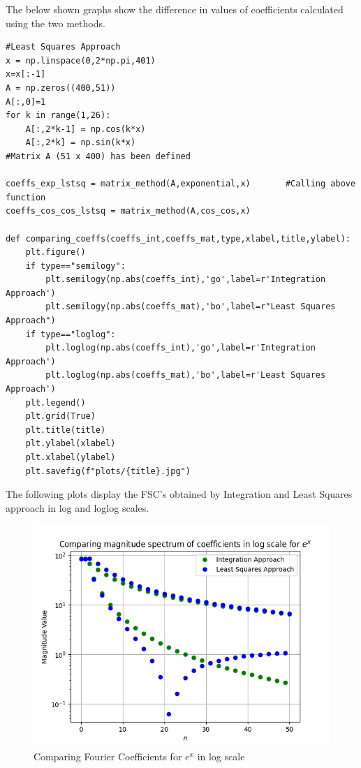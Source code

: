 \documentclass{article}
\begin{document}
\par The below shown graphs show the difference in values of coefficients calculated using the two methods.


\begin{lstlisting}
#Least Squares Approach
x = np.linspace(0,2*np.pi,401)
x=x[:-1]  
A = np.zeros((400,51)) 
A[:,0]=1 
for k in range(1,26):
    A[:,2*k-1] = np.cos(k*x) 
    A[:,2*k] = np.sin(k*x) 
#Matrix A (51 x 400) has been defined 

coeffs_exp_lstsq = matrix_method(A,exponential,x)       #Calling above function
coeffs_cos_cos_lstsq = matrix_method(A,cos_cos,x) 

def comparing_coeffs(coeffs_int,coeffs_mat,type,xlabel,title,ylabel):
    plt.figure()
    if type=="semilogy":
        plt.semilogy(np.abs(coeffs_int),'go',label=r'Integration Approach')
        plt.semilogy(np.abs(coeffs_mat),'bo',label=r"Least Squares Approach")
    if type=="loglog":
        plt.loglog(np.abs(coeffs_int),'go',label=r'Integration Approach')
        plt.loglog(np.abs(coeffs_mat),'bo',label=r'Least Squares Approach')
    plt.legend()
    plt.grid(True)
    plt.title(title)
    plt.ylabel(xlabel)
    plt.xlabel(ylabel)
    plt.savefig(f"plots/{title}.jpg")

\end{lstlisting}

\hfill \break
The following plots display the FSC's obtained by Integration and Least Squares approach in log and loglog scales.

\begin{figure}[!tbh]
    \centering
    \includegraphics[scale=0.65]{plots/Comparing magnitude spectrum of coefficients in log scale for $e^x$.jpg}
    \caption{Comparing Fourier Coefficients for $e^x$ in log scale}
    \label{fig:Figure 7}
    \end{figure}
\end{document}
